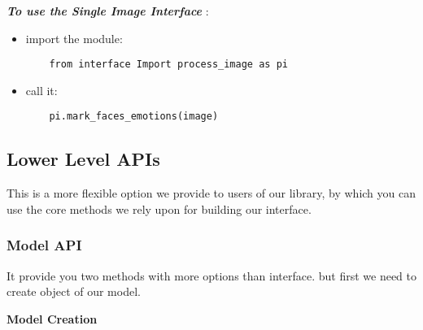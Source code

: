 \noindent \textbf{\textit{To use the Single Image Interface }}:
\begin{itemize}
	\item import the module:
	\begin{verbatim}
	from interface Import process_image as pi
	\end{verbatim}
	\item call it:
	\begin{verbatim}
	pi.mark_faces_emotions(image)
	\end{verbatim}
\end{itemize}

\newpage

\begin{center}
	\subsection{Lower Level APIs}
	This is a more flexible option we provide to users of our library, by which you can use the core methods we rely upon for building our interface.
\end{center}

\newpage 

\subsubsection{Model API}
It provide you two methods with more options than interface.\newline
but first we need to create object of our model.
\bigbreak

\textbf{Model Creation}


